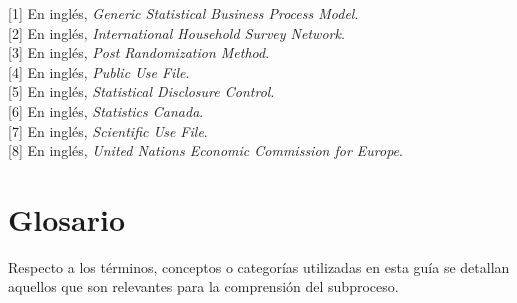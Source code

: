 \documentclass[]{book}
\theoremstyle{definition}
\theoremstyle{definition}
\theoremstyle{definition}
\theoremstyle{definition}
\theoremstyle{remark}
\begin{document}
{[}1{]} En inglés, \emph{Generic Statistical Business Process Model}.\\
{[}2{]} En inglés, \emph{International Household Survey Network}.\\
{[}3{]} En inglés, \emph{Post Randomization Method}.\\
{[}4{]} En inglés, \emph{Public Use File}.\\
{[}5{]} En inglés, \emph{Statistical Disclosure Control}.\\
{[}6{]} En inglés, \emph{Statistics Canada}.\\
{[}7{]} En inglés, \emph{Scientific Use File}.\\
{[}8{]} En inglés, \emph{United Nations Economic Commission for Europe}.

\hypertarget{glosario}{%
\section{Glosario}\label{glosario}}

Respecto a los términos, conceptos o categorías utilizadas en esta guía se detallan aquellos que son relevantes para la comprensión del subproceso.
\end{document}
